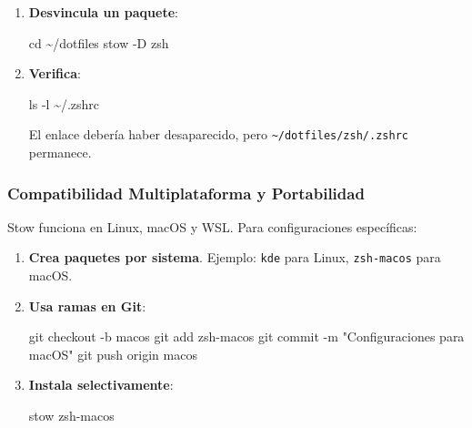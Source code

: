 \documentclass[
  jou,
  floatsintext,
  longtable,
  a4paper,
  nolmodern,
  notxfonts,
  notimes,
  colorlinks=true,linkcolor=blue,citecolor=blue,urlcolor=blue]{apa7}
\newenvironment{Shaded}{\begin{snugshade}}{\end{snugshade}}
\newcommand{\AttributeTok}[1]{\textcolor[rgb]{0.40,0.45,0.13}{#1}}
\newcommand{\BuiltInTok}[1]{\textcolor[rgb]{0.00,0.23,0.31}{#1}}
\newcommand{\ExtensionTok}[1]{\textcolor[rgb]{0.00,0.23,0.31}{#1}}
\newcommand{\FunctionTok}[1]{\textcolor[rgb]{0.28,0.35,0.67}{#1}}
\newcommand{\NormalTok}[1]{\textcolor[rgb]{0.00,0.23,0.31}{#1}}
\newcommand{\StringTok}[1]{\textcolor[rgb]{0.13,0.47,0.30}{#1}}
\begin{document}
\begin{enumerate}
\def\labelenumi{\arabic{enumi}.}
\item
  \textbf{Desvincula un paquete}:

\begin{Shaded}
\begin{Highlighting}[]
\BuiltInTok{cd}\NormalTok{ \textasciitilde{}/dotfiles}
\ExtensionTok{stow} \AttributeTok{{-}D}\NormalTok{ zsh}
\end{Highlighting}
\end{Shaded}
\item
  \textbf{Verifica}:

\begin{Shaded}
\begin{Highlighting}[]
\FunctionTok{ls} \AttributeTok{{-}l}\NormalTok{ \textasciitilde{}/.zshrc}
\end{Highlighting}
\end{Shaded}

  El enlace debería haber desaparecido, pero
  \texttt{\textasciitilde{}/dotfiles/zsh/.zshrc} permanece.
\end{enumerate}

\subsubsection{Compatibilidad Multiplataforma y
Portabilidad}\label{compatibilidad-multiplataforma-y-portabilidad}

Stow funciona en Linux, macOS y WSL. Para configuraciones específicas:

\begin{enumerate}
\def\labelenumi{\arabic{enumi}.}
\item
  \textbf{Crea paquetes por sistema}. Ejemplo: \texttt{kde} para Linux,
  \texttt{zsh-macos} para macOS.
\item
  \textbf{Usa ramas en Git}:

\begin{Shaded}
\begin{Highlighting}[]
\FunctionTok{git}\NormalTok{ checkout }\AttributeTok{{-}b}\NormalTok{ macos}
\FunctionTok{git}\NormalTok{ add zsh{-}macos}
\FunctionTok{git}\NormalTok{ commit }\AttributeTok{{-}m} \StringTok{"Configuraciones para macOS"}
\FunctionTok{git}\NormalTok{ push origin macos}
\end{Highlighting}
\end{Shaded}
\item
  \textbf{Instala selectivamente}:

\begin{Shaded}
\begin{Highlighting}[]
\ExtensionTok{stow}\NormalTok{ zsh{-}macos}
\end{Highlighting}
\end{Shaded}
\end{enumerate}
\end{document}
